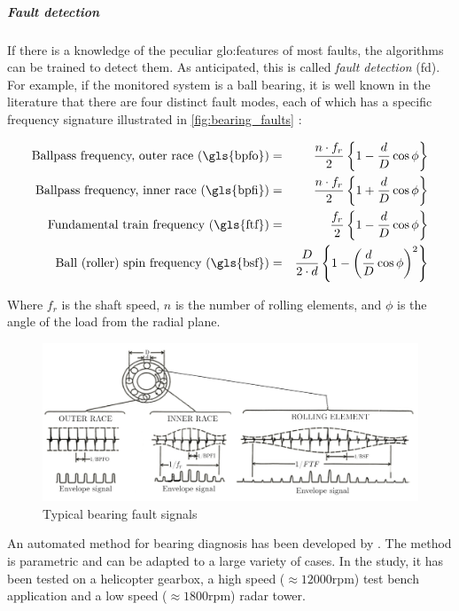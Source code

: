 \subparagraph*{Fault detection}
If there is a knowledge of the peculiar \gls{glo:feature}s of most faults, the algorithms can be trained to detect them. As anticipated, this is called \emph{fault detection} (\gls{fd}). For example, if the monitored system is a ball bearing, it is well known in the literature that there are four distinct fault modes, each of which has a specific frequency signature illustrated in \autoref{fig:bearing_faults} \cite{RollingSignature}:

\begin{eqnarray*}
    \text{Ballpass frequency, outer race (\gls{bpfo})}&=& \frac{n\cdot f_r}{2}\left\{1-\frac{d}{D} \cos \phi \right\}\\
    \text{Ballpass frequency, inner race (\gls{bpfi})}&=& \frac{n\cdot f_r}{2}\left\{1+\frac{d}{D} \cos \phi \right\}\\
    \text{Fundamental train frequency (\gls{ftf})}&=& \frac{f_r}{2}\left\{1-\frac{d}{D} \cos \phi \right\}\\
    \text{Ball (roller) spin frequency (\gls{bsf})}&=& \frac{D}{2\cdot d}\left\{1-\left(\frac{d}{D} \cos \phi \right)^2\right\}
\end{eqnarray*}

Where $f_r$ is the shaft speed, $n$ is the number of rolling elements, and $\phi$ is the angle of the load from the radial plane. 

\begin{figure}
    \centering
    \includegraphics[width=\textwidth]{images/StateArt/bearing.jpg}
    \caption{Typical bearing fault signals \cite{RollingSignature}}
    \label{fig:bearing_faults}
\end{figure}

An automated method for bearing diagnosis has been developed by \cite{sawalhi2008semi}. The method is parametric and can be adapted to a large variety of cases. In the study, it has been tested on a helicopter gearbox, a high speed ($\approx 12000$rpm) test bench application and a low speed ($\approx 1800$rpm) radar tower. 


